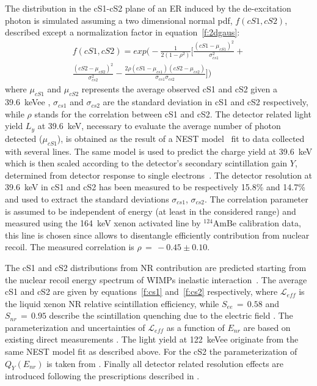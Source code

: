 The distribution in the cS1-cS2 plane of an ER induced by the de-excitation photon is simulated assuming a two dimensional normal pdf, $f(cS1,cS2)$, 
described except a normalization factor in equation~\ref{f:2dgaus}:
\begin{multline}
	f(cS1,cS2)  = exp \Big( -\frac{1}{2(1-\rho^2)} \Big[ \frac{(cS1 - \mu_{cS1})^2}{\sigma_{cs1}^2} + \\ 
	 \frac{(cS2 - \mu_{cS2})^2}{\sigma_{cs2}^2} - \frac{2\rho(cS1 - \mu_{cs1}) (cS2 - \mu_{cs2})} {\sigma_{cs1}\sigma_{cs2}} \Big] \Big) 
\label{f:2dgaus}
\end{multline}
where $\mu_{cS1}$ and $\mu_{cS2}$ 
represents the average observed cS1 and cS2 given a 39.6~keVee , $\sigma_{cs1}$ and $\sigma_{cs2}$ are the standard deviation in cS1 and cS2 respectively,
while $\rho$ stands for the correlation between cS1 and cS2.
The detector related light yield $L_y$  at 39.6~keV, necessary to evaluate the average number of photon detected ($\mu_{cS1}$),
is obtained as the result of a NEST model~\cite{NEST,Geant1,Geant2} fit to data collected with several lines.  The same model is used to predict the charge yield at
39.6~keV which is then scaled according to the detector's secondary scintillation gain $Y$, determined from detector response to single electrons~\cite{SingleE}.
The detector resolution at 39.6~keV in cS1 and cS2 has been measured to be respectively 15.8\% and 14.7\% and used to extract the standard 
deviations $\sigma_{cs1}$, $\sigma_{cs2}$.  The correlation parameter is assumed to be independent of energy (at least in the considered range) and measured
using the 164~keV xenon activated line by $^{124}$AmBe calibration data, this line is chosen since allows to disentangle efficiently contribution from nuclear recoil.
The measured correlation is $\rho \, = \, -0.45 \pm 0.10$. 


The cS1 and cS2 distributions from NR contribution are predicted starting from the nuclear recoil energy spectrum
of WIMPs inelastic interaction~\cite{inelastic_th}. The average cS1 and cS2 are given by equations~\ref{f:cs1} and~\ref{f:cs2} respectively,
where $\mathcal{L}_{eff}$ is the liquid xenon NR relative scintillation efficiency, while $S_{ee} \, = \, 0.58$  and $S_{nr} \, = \, 0.95$ describe the scintillation 
quenching due to the electric field \cite{ScintQuenching}. The parameterization and uncertainties of $\mathcal{L}_{eff}$ as a function of $E_{nr}$ are based on existing 
direct measurements \cite{run8Result}. The light yield at 122~keVee originate from the same NEST model fit as described above. For the cS2 the parameterization 
of $Q_{Y}(E_{nr})$ is taken from \cite{QY}.
Finally all detector related resolution effects are introduced following the prescriptions described in \cite{dataAnalysis}.

